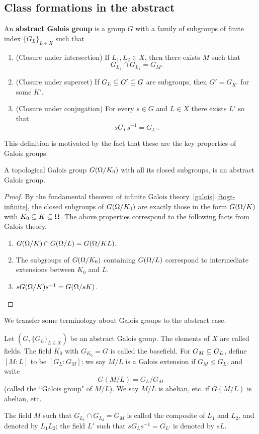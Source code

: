 \subsection{Class formations in the abstract}
\begin{df}
An \textbf{abstract Galois group} is a group $G$ with a family of subgroups of finite index $\{G_L\}_{L\in X}$ such that
\begin{enumerate}
\item (Closure under intersection) If $L_1,L_2\in X$, then there exists $M$ such that
\[
G_{L_1}\cap G_{L_2}=G_M.
\]
\item (Closure under superset) If $G_L\subseteq G'\subseteq G$ are subgroups, then $G'=G_{K'}$ for some $K'$.
\item (Closure under conjugation) For every $s\in G$ and $L\in X$ there exists $L'$ so that 
\[sG_Ls^{-1}=G_{L'}.\]
\end{enumerate}
\end{df}
This definition is motivated by the fact that these are the key properties of Galois groups.
\begin{pr}
A topological Galois group $G(\Omega/K_0)$ with all its closed subgroups, is an abstract Galois group.
\end{pr}
\begin{proof}
By the fundamental theorem of infinite Galois theory~\ref{galois}.\ref{ftogt-infinite}, the closed subgroups of $G(\Omega/K_0)$ are exactly those in the form $G(\Omega/K)$ with $K_0\subseteq K\subseteq \Omega$. The above properties correspond to the following facts from Galois theory.
\begin{enumerate}
\item
$
G(\Omega/K)\cap G(\Omega/L)=G(\Omega/KL).
$
\item The subgroups of $G(\Omega/K_0)$ containing $G(\Omega/L)$ correspond to intermediate extensions between $K_0$ and $L$.
\item $sG(\Omega/K)s^{-1}=G(\Omega/sK)$.
\qedhere
\end{enumerate}
\end{proof}
We transfer some terminology about Galois groups to the abstract case.
\begin{df}
Let $(G,\{G_L\}_{L\in X})$ be an abstract Galois group. The elements of $X$ are called fields. The field $K_0$ with $G_{K_0}=G$ is called the basefield. 
For $G_M\subseteq G_L$, define $[M:L]$ to be $[G_L:G_M]$; 
we say $M/L$ is a Galois extension if $G_M\trianglelefteq G_L$, and write
\[
G(M/L)=G_L/G_M
\]
(called the ``Galois group" of $M/L$). We say $M/L$ is abelian, etc. if $G(M/L)$ is abelian, etc.

The field $M$ such that $G_{L_1}\cap G_{L_2}=G_{M}$ is called the composite of $L_1$ and $L_2$, and denoted by $L_1L_2$; the field $L'$ such that $sG_Ls^{-1}=G_{L'}$ is denoted by $sL$.
\end{df}
